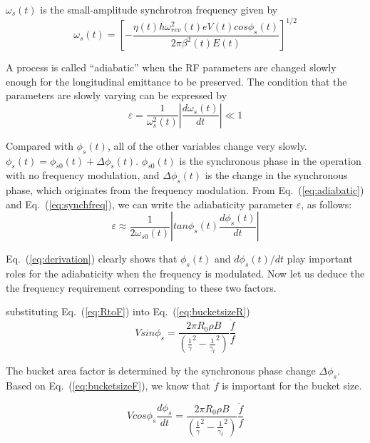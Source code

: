 $\omega_s(t)$ is the small-amplitude synchrotron frequency given by
\begin{equation}
\omega_s(t) =[{-\frac{\eta(t)h\omega_{rev}^2(t)eV(t)cos{\phi_s(t)}}{2\pi\beta^2(t)E(t)}}]^{1/2}
\label{eq:synchfreq}
\end{equation} 

A process is called “adiabatic” when the RF parameters are changed slowly enough for the longitudinal emittance to be preserved. The condition that the parameters are slowly varying can be expressed by
\begin{equation}
\varepsilon=\frac{1}{\omega_s^2(t)}|\frac{d\omega_s(t)}{dt}| \ll 1
\label{eq:adiabaticity}
\end{equation} 

Compared with $\phi_s(t)$, all of the other variables change very slowly. $\phi_s(t)=\phi_{s0}(t)+\Delta\phi_s(t)$. $\phi_{s0}(t)$ is the synchronous phase in the operation with no frequency modulation, and $\Delta \phi_s(t)$ is the change in the synchronous phase, which originates from the frequency modulation. From Eq.~(\ref{eq:adiabatic}) and Eq.~(\ref{eq:synchfreq}), we can write the adiabaticity parameter $\varepsilon$, as follows:
\begin{equation}
\varepsilon \approx \frac{1}{2\omega_{s0}(t)}|tan\phi_{s}(t)\frac{d\phi_s(t)}{dt}|
\label{eq:derivation}
\end{equation} 

Eq.~(\ref{eq:derivation}) clearly shows that $\phi_s(t)$ and $d\phi_s(t)/dt$ play important roles for the adiabaticity when the frequency is modulated. Now let us deduce the the frequency requirement corresponding to these two factors. 


substituting Eq.~(\ref{eq:RtoF}) into Eq.~(\ref{eq:bucketsizeR})
\begin{equation}
Vsin\phi_s=\frac{2\pi R_0 \rho B}{(\frac{1}{\gamma}^2-\frac{1}{\gamma_t}^2)}\frac{\dot f}{f} 
\label{eq:bucketsizeF}
\end{equation}

The bucket area factor is determined by the synchronous phase change $\Delta\phi_s$. Based on Eq.~(\ref{eq:bucketsizeF}), we know that $\dot f$ is important for the bucket size.


\begin{equation}
Vcos\phi_s\frac{d\phi_s}{dt}=\frac{2\pi R_0 \rho B}{(\frac{1}{\gamma}^2-\frac{1}{\gamma_t}^2)}\frac{\ddot f}{f} 
\label{eq:bucketsizeF}
\end{equation}

